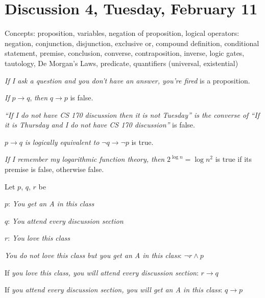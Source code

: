 \section{Discussion 4, Tuesday, February 11}

Concepts: proposition, variables, negation of proposition, logical operators: negation, conjunction, disjunction, exclusive or, compound definition, conditional statement, premise, conclusion, converse, contraposition, inverse, logic gates, tautology, De Morgan's Laws, predicate, quantifiers (universal, existential)

\begin{ex}

\textit{If I ask a question and you don't have an answer, you're fired} is a proposition.

\end{ex}

\begin{ex}

\textit{If} $p \rightarrow q$, \textit{then} $q \rightarrow p$ is false.

\end{ex}

\begin{ex}

\textit{``If I do not have CS 170 discussion then it is not Tuesday'' is the converse of ``If it is Thursday and I do not have CS 170 discussion''} is false.

\end{ex}

\begin{ex}

$p \rightarrow q$ \textit{is logically equivalent to} $\lnot q \rightarrow \lnot p$ is true.

\end{ex}

\begin{ex}

\textit{If I remember my logarithmic function theory, then} $2^{\log n} = \log n^2$ is true if its premise is false, otherwise false.

\end{ex}

\begin{prob}

Let $p$, $q$, $r$ be

$p$: \textit{You get an A in this class}

$q$: \textit{You attend every discussion section}

$r$: \textit{You love this class}

\textit{You do not love this class but you get an A in this class}: $\lnot r \land p$

If \textit{you love this class, you will attend every discussion section}: $r \rightarrow q$

If \textit{you attend every discussion section, you will get an A in this class}: $q \rightarrow p$

\end{prob}

